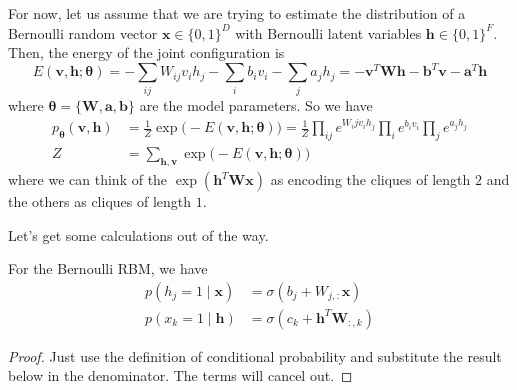    \begin{definition}
      For now, let us assume that we are trying to estimate the distribution of a Bernoulli random vector $\mathbf{x} \in \{0, 1\}^D$ with Bernoulli latent variables $\mathbf{h} \in \{0, 1\}^F$. Then, the energy of the joint configuration is  
        \[E(\mathbf{v}, \mathbf{h}; \boldsymbol{\theta}) = - \sum_{ij} W_{ij} v_i h_j - \sum_i b_i v_i - \sum_j a_j h_j = - \mathbf{v}^T \mathbf{W} \mathbf{h} - \mathbf{b}^T \mathbf{v} - \mathbf{a}^T \mathbf{h}\]
      where $\boldsymbol{\theta} = \{\mathbf{W}, \mathbf{a}, \mathbf{b}\}$ are the model parameters. So we have 
        \begin{align*} 
          p_{\boldsymbol{\theta}} (\mathbf{v}, \mathbf{h}) & = \frac{1}{Z} \exp \big( -E (\mathbf{v}, \mathbf{h}; \boldsymbol{\theta})\big) = \frac{1}{Z} \prod_{ij} e^{W_ij v_i h_j} \prod_i e^{b_i v_i} \prod_j e^{a_j h_j} \\
          Z & = \sum_{\mathbf{h}, \mathbf{v}} \exp \big( -E(\mathbf{v}, \mathbf{h}; \boldsymbol{\theta}) \big) 
        \end{align*}
      where we can think of the $\exp(\mathbf{h}^T \mathbf{W} \mathbf{x})$ as encoding the cliques of length $2$ and the others as cliques of length $1$.  
    \end{definition}

    Let's get some calculations out of the way. 

    \begin{lemma} 
      For the Bernoulli RBM, we have 
      \begin{align*} 
        p(h_j = 1 \mid \mathbf{x}) & = \sigma ( b_j + W_{j,:} \mathbf{x}) \\
        p(x_k = 1 \mid \mathbf{h}) & = \sigma ( c_k + \mathbf{h}^T \mathbf{W}_{:, k})
      \end{align*}
    \end{lemma}
    \begin{proof}
      Just use the definition of conditional probability and substitute the result below in the denominator. The terms will cancel out. 
    \end{proof}


